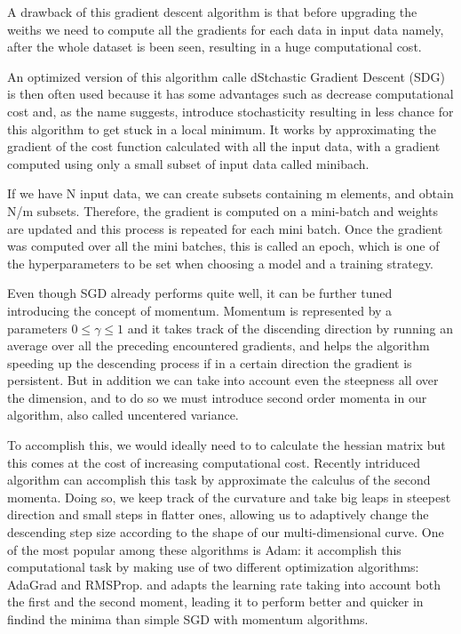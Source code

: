 \documentclass[a4paper,11pt]{article}
\begin{document}
A drawback of this gradient descent algorithm is that before upgrading the weiths we need to compute all the gradients for each data in input data namely, after the whole dataset is been seen, resulting in a huge computational cost.

An optimized version of this algorithm calle dStchastic Gradient Descent (SDG) is then often used because it has some advantages such as decrease computational cost and, as the name suggests, introduce stochasticity resulting in less chance for this algorithm to get stuck in a local minimum.
It works by approximating the gradient of the cost function calculated with all the input data, with a gradient computed using only a small subset of input data called minibach.

If we have N input data, we can create subsets containing m elements, and obtain N/m subsets.
Therefore, the gradient is computed on a mini-batch and weights are updated and this process is repeated for each mini batch.
Once the gradient was computed over all the mini batches, this is called an epoch, which is one of the hyperparameters to be set when choosing a model and a training strategy.


Even though SGD already performs quite well, it can be further tuned introducing the concept of momentum.
Momentum is represented by a parameters $0\le \gamma \le 1$ and it takes track of the discending direction by running an average over all the preceding encountered gradients, and helps the algorithm speeding up the descending process if in a certain direction the gradient is persistent.
But in addition we can take into account even the steepness all over the dimension, and to do so we must introduce second order momenta in our algorithm, also called uncentered variance.

To accomplish this, we would ideally need to to calculate the hessian matrix but this comes at the cost of increasing computational cost.
Recently intriduced algorithm can accomplish this task by approximate the calculus of the second momenta.
Doing so, we keep track of the curvature and take big leaps in steepest direction and small steps in flatter ones, allowing us to adaptively change the descending step size according to the shape of our multi-dimensional curve.
One of the most popular among these algorithms is Adam: it accomplish this computational task by making use of two different optimization algorithms: AdaGrad and RMSProp. and adapts the learning rate taking into account both the first and the second moment, leading it to perform better and quicker in findind the minima than simple SGD with momentum algorithms.
\end{document}
